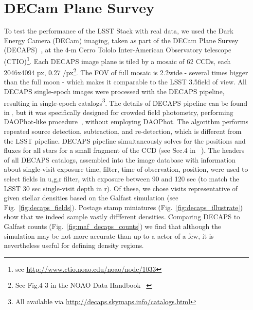 \documentclass[DM,lsstdraft,toc,usenatbib,authoryear]{lsstdoc}
\begin{document}

\section{DECam Plane Survey }
\label{sec:DECAPS}
To test the performance of the LSST Stack with real data, we used the Dark Energy Camera (DECam) imaging, taken as part of the  DECam Plane Survey (DECAPS)~\citep{schlafly2017}, at the 4-m Cerro Tololo Inter-American Observatory telescope (CTIO)\footnote{see \url{http://www.ctio.noao.edu/noao/node/1033}}. Each DECAPS image plane is tiled by a mosaic of 62 CCDs, each  2046x4094 px, 0.27 \arcsec/px\footnote{See Fig.4-3 in the NOAO Data Handbook ~\citep{shaw2015}}. The FOV of full mosaic is 2.2\degree  wide -  several times bigger than the full moon - which makes it comparable to the LSST 3.5\degree field of view.  All DECAPS single-epoch images were processed with the DECAPS pipeline, resulting in single-epoch catalogs\footnote{All available via \url{http://decaps.skymaps.info/catalogs.html}}. The details of DECAPS pipeline can be found in \citet{schlafly2017}, but it was specifically designed for crowded field photometry,  performing DAOPhot-like procedure~\citep{stetson1987}, without employing DAOPhot. The algorithm performs repeated source detection, subtraction, and re-detection, which is different from the LSST pipeline. DECAPS pipeline simultaneously solves for the positions and fluxes for all stars for a small fragment of the CCD (see Sec.4 in ~\citealt{schlafly2017}).  The headers of all DECAPS catalogs,  assembled into the image database with information about single-visit exposure time, filter,  time of observation, position, were
used to select fields in  u,g,r  filter, with exposure between 90 and 120 sec (to match the LSST 30 sec single-visit depth in r). Of these, we chose visits representative of given stellar densities based on the Galfast simulation (see Fig.~\ref{fig:decaps_fields}).  Postage stamp miniatures (Fig.~\ref{fig:decaps_illustrate}) show that we indeed sample vastly diffferent densities. Comparing DECAPS to Galfast counts (Fig.~\ref{fig:maf_decaps_counts}) we find that although the simulation may be not more accurate than up to a actor of a few, it is nevertheless useful for defining density regions.
\end{document}
